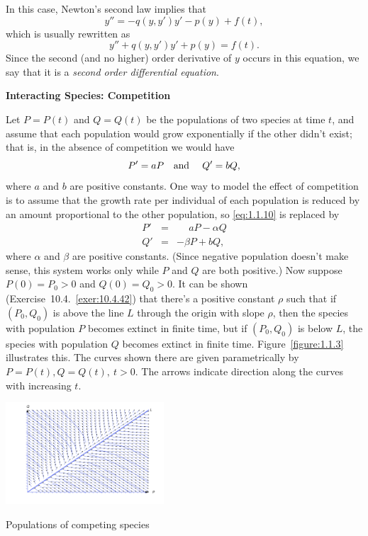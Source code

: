 \documentclass{ximera}
\begin{document}
In this case, Newton's second law implies that
$$
y''=-q(y,y')y'-p(y)+f(t),
$$
which is usually rewritten as
$$
y''+q(y,y')y'+p(y)=f(t).
$$
Since the  second (and no higher) order derivative of $y$ occurs in
this equation, we say that it is a {\color{blue}\it second order differential
equation\/}.


\textbf{Interacting Species: Competition}

\noindent
Let $P=P(t)$ and $Q=Q(t)$ be the populations of two species at time
$t$, and assume that each population would grow exponentially if the
other didn't exist; that is, in the absence of competition we would
have
\begin{equation} \label{eq:1.1.10}
P'=aP \mbox{\quad and \quad}Q'=bQ,
\end{equation}
where $a$ and $b$ are positive constants. One way to model the effect
of competition is to assume that the growth rate per individual of
each population is reduced by an amount proportional to the other
population, so \eqref{eq:1.1.10} is replaced by
\begin{eqnarray*}
P'&=&\phantom{-}aP-\alpha Q\\
Q'&=&-\beta P+bQ,
\end{eqnarray*}
where $\alpha$ and $\beta$ are positive constants. (Since negative
population doesn't make sense, this system works only while $P$ and
$Q$ are both positive.) Now suppose   $P(0)=P_0>0$ and
$Q(0)=Q_0>0$. It can be shown (Exercise~10.4.~\hspace*{-3pt}\ref{exer:10.4.42})
that there's a  positive constant $\rho$ such that if
$(P_0,Q_0)$ is above the line $L$ through the origin with slope $\rho$,
then the species with population $P$ becomes extinct in finite time,
but if $(P_0,Q_0)$ is below $L$,   the species with population
$Q$ becomes extinct in finite time. Figure~\ref{figure:1.1.3} illustrates
this. The curves shown there are given parametrically by $P=P(t),
Q=Q(t),\ t>0$.
 The arrows indicate direction along the curves with
increasing $t$.

\begin{image}
  \includegraphics[height=1.5in]{fig010103.jpg}
\end{image}
{\centering
\color{blue}
 \caption{Populations of competing species}

 }
\end{document}
